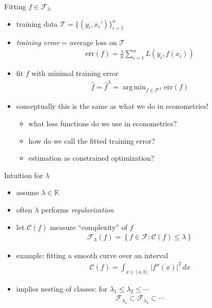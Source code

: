 \documentclass[xcolor=dvipsnames]{beamer}
\DeclareMathOperator{\argmin}{arg\,min}
\begin{document}
\begin{frame}{Fitting $f \in \mathcal{F}_{\lambda}$}
\begin{itemize}
  \item training data $\mathcal{T} = \{ (y_i, x_i') \}_{i=1}^n$
  \item \emph{training error} = average loss on $\mathcal{T}$
  \begin{align*}
     \overline{\text{err}} (f) = \frac{1}{n} \sum_{i=1}^n L\left(y_i, f(x_i) \right) 
   \end{align*} 
   \pause
   \item fit $f$ with minimal training error
   \begin{align*}
     \hat{f} = \hat{f}^{\lambda} = \argmin_{f \in \mathcal{F}^{\lambda}} \overline{\text{err}} (f) 
   \end{align*}
   \pause 
   \item conceptually this is the same as what we do in econometrics! 
   \begin{itemize}
     \pause\item what loss functions do we use in econometrics?
     \pause\item how do we call the fitted training error?
     \pause\item estimation as constrained optimization?
   \end{itemize}
\end{itemize}
\end{frame}


\begin{frame}{Intuition for $\lambda$}
\begin{itemize}
  \item assume $\lambda \in \mathbb{R}$
  \item often $\lambda$ performs \emph{regularization}
  \pause
  \item let $\mathcal{C}(f)$ measure ``complexity'' of $f$
  \begin{align*}
    \mathcal{F}_{\lambda}(f) = \left\{f \in \mathcal{F} : \mathcal{C}(f) \leq \lambda \right\}   
  \end{align*} 
  \pause 
  \item example: fitting a smooth curve over an interval
  \begin{align*}
    \mathcal{C}(f) = \int_{x \in [a,b]} \lvert f''(x) \rvert^2 \, dx
  \end{align*}
  \pause 
  \item implies nesting of classes: for $\lambda_1 \leq \lambda_2 \leq \dotsb$
  \begin{align*}
    \mathcal{F}_{\lambda_1}\subset \mathcal{F}_{\lambda_2} \subset \dotsb
  \end{align*}
\end{itemize}
\end{frame}
\end{document}
